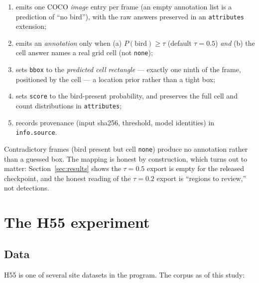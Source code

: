 \documentclass[11pt]{article}
\newcommand{\code}[1]{\texttt{#1}}
\begin{document}
\begin{enumerate}
  \item emits one COCO \emph{image} entry per frame (an empty annotation list
        is a prediction of ``no bird''), with the raw answers preserved in an
        \code{attributes} extension;
  \item emits an \emph{annotation} only when (a) $P(\text{bird}) \ge \tau$
        (default $\tau = 0.5$) \emph{and} (b) the cell answer names a real
        grid cell (not \code{none});
  \item sets \code{bbox} to the \emph{predicted cell rectangle} --- exactly one
        ninth of the frame, positioned by the cell --- a location prior rather
        than a tight box;
  \item sets \code{score} to the bird-present probability, and preserves the
        full cell and count distributions in \code{attributes};
  \item records provenance (input sha256, threshold, model identities) in
        \code{info.source}.
\end{enumerate}

Contradictory frames (bird present but cell \code{none}) produce no annotation
rather than a guessed box. The mapping is honest by construction, which turns
out to matter: Section~\ref{sec:results} shows the $\tau=0.5$ export is empty
for the released checkpoint, and the honest reading of the $\tau=0.2$ export
is ``regions to review,'' not detections.

\section{The H55 experiment}
\label{sec:experiment}

\subsection{Data}

H55 is one of several site datasets in the program. The corpus as of this
study:
\end{document}
